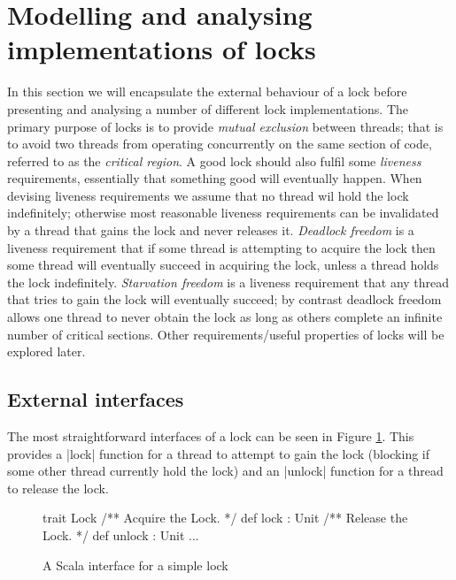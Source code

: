 \section{Modelling and analysing implementations of locks}
\label{sec:locks}

\inlineScala

In this section we will encapsulate the external behaviour of a lock before presenting and analysing a number of different lock implementations. 
The primary purpose of locks is to provide \emph{mutual exclusion} between threads; that is to avoid two threads from operating concurrently on the same section of code, referred to as the \emph{critical region}. A good lock should also fulfil some \emph{liveness} requirements, essentially that something good will eventually happen. When devising liveness requirements we assume that no thread wil hold the lock indefinitely; otherwise most reasonable liveness requirements can be invalidated by a thread that gains the lock and never releases it. \emph{Deadlock freedom} is a liveness requirement that if some thread is attempting to acquire the lock then some thread will eventually succeed in acquiring the lock, unless a thread holds the lock indefinitely. \emph{Starvation freedom} is a liveness requirement that any thread that tries to gain the lock will eventually succeed; by contrast deadlock freedom allows one thread to never obtain the lock as long as others complete an infinite number of critical sections. Other requirements/useful properties of locks will be explored later.

\subsection{External interfaces}

The most straightforward interfaces of a lock can be seen in Figure \ref{code:LockInterface}. This provides a |lock| function for a thread to attempt to gain the lock (blocking if some other thread currently hold the lock) and an |unlock| function for a thread to release the lock. 

\begin{figure}
\begin{scala}
  trait Lock{
    /** Acquire the Lock. */
    def lock : Unit
    /** Release the Lock. */
    def unlock : Unit 
    ...
  }
\end{scala}
\caption{A Scala interface for a simple lock}
\label{code:LockInterface}
\end{figure}

